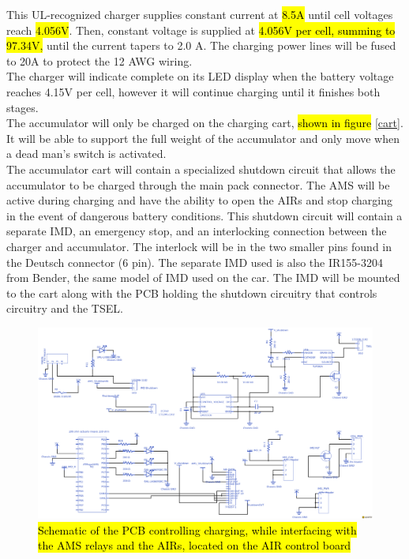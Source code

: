 \documentclass{article}
\DeclareRobustCommand{\hlr}[1]{{\sethlcolor{red}\hl{#1}}}
\begin{document}
            This UL-recognized charger supplies constant current at \hlr{8.5A} until cell voltages reach \hlr{4.056V}. Then, constant voltage is supplied at \hlr{4.056V per cell, summing to 97.34V,} until the current tapers to 2.0 A. The charging power lines will be fused to 20A to protect the  12 AWG wiring.\\

            The charger will indicate complete on its LED display when the battery voltage reaches 4.15V per cell, however it will continue charging until it finishes both stages.\\

            The accumulator will only be charged on the charging cart, \hlr{shown in figure} \ref{cart}. It will be able to support the full weight of the accumulator and only move when a dead man's switch is activated.\\

            The accumulator cart will contain a specialized shutdown circuit that allows the accumulator to be charged through the main pack connector. The AMS will be active during charging and have the ability to open the AIRs and stop charging in the event of dangerous battery conditions. This shutdown circuit will contain a separate IMD, an emergency stop, and an interlocking connection between the charger and accumulator. The interlock will be in the two smaller pins found in the Deutsch connector (6 pin). The separate IMD used is also the IR155-3204 from Bender, the same model of IMD used on the car. The IMD will be mounted to the cart along with the PCB holding the shutdown circuitry that controls circuitry and the TSEL.

            \begin{figure}[H]
                \centering
                \includegraphics[width = 0.7 \textwidth]{chargingschem}
                \caption{\hlr{Schematic of the PCB controlling charging, while interfacing with the AMS relays and the AIRs, located on the AIR control board}}
                \label{chargeschem}
            \end{figure}
\end{document}
